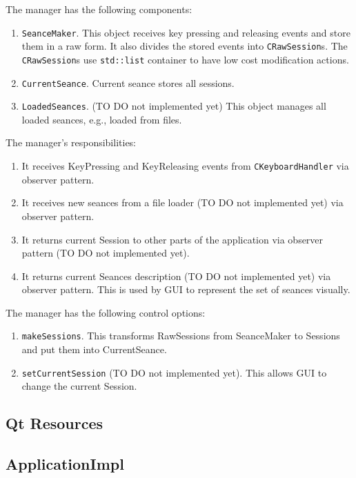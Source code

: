 \documentclass{article}
\begin{document}
The manager has the following components:
\begin{enumerate}
\item \verb"SeanceMaker". This object receives key pressing and releasing events and store them in a raw form. It also divides the stored events into \verb"CRawSession"s. The \verb"CRawSession"s use \verb"std::list" container to have low cost modification actions.

\item \verb"CurrentSeance". Current seance stores all sessions.

\item \verb"LoadedSeances". (TO DO not implemented yet) This object manages all loaded seances, e.g., loaded from files.
\end{enumerate}

The manager's responsibilities:
\begin{enumerate}
\item It receives KeyPressing and KeyReleasing events from \verb"CKeyboardHandler" via observer pattern.

\item It receives new seances from a file loader (TO DO not implemented yet) via observer pattern.

\item It returns current Session to other parts of the application via observer pattern (TO DO not implemented yet).

\item It returns current Seances description (TO DO not implemented yet) via observer pattern. This is used by GUI to represent the set of seances visually.
\end{enumerate}

The manager has the following control options:
\begin{enumerate}
\item \verb"makeSessions". This transforms RawSessions from SeanceMaker to Sessions and put them into CurrentSeance.
\item \verb"setCurrentSession" (TO DO not implemented yet). This allows GUI to change the current Session.
\end{enumerate}


\subsection{Qt Resources}

\subsection{ApplicationImpl}
\end{document}
